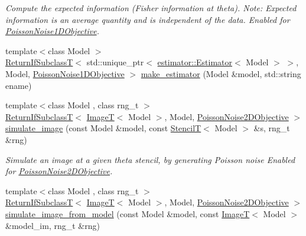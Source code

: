 \begin{DoxyCompactItemize}
\begin{DoxyCompactList}\small\item\em Compute the expected information (Fisher information at theta). Note\+: Expected information is an average quantity and is independent of the data. Enabled for \hyperlink{classmappel_1_1PoissonNoise1DObjective}{Poisson\+Noise1\+D\+Objective}. \end{DoxyCompactList}\item 
{\footnotesize template$<$class Model $>$ }\\\hyperlink{namespacemappel_a3b77d227658ba3ba9e16fea6fa6e626d}{Return\+If\+SubclassT}$<$ std\+::unique\+\_\+ptr$<$ \hyperlink{classmappel_1_1estimator_1_1Estimator}{estimator\+::\+Estimator}$<$ Model $>$ $>$, Model, \hyperlink{classmappel_1_1PoissonNoise1DObjective}{Poisson\+Noise1\+D\+Objective} $>$ \hyperlink{namespacemappel_1_1methods_af2dbe8ce33d78622eca14c57aefa1d7b}{make\+\_\+estimator} (Model \&model, std\+::string ename)
\item 
{\footnotesize template$<$class Model , class rng\+\_\+t $>$ }\\\hyperlink{namespacemappel_a3b77d227658ba3ba9e16fea6fa6e626d}{Return\+If\+SubclassT}$<$ \hyperlink{namespacemappel_a14658186b77757f3c35a69cb1be6cf4b}{ImageT}$<$ Model $>$, Model, \hyperlink{classmappel_1_1PoissonNoise2DObjective}{Poisson\+Noise2\+D\+Objective} $>$ \hyperlink{namespacemappel_1_1methods_a2b9a50b06cafb7ac9d857589df8979dc}{simulate\+\_\+image} (const Model \&model, const \hyperlink{namespacemappel_a3a06598240007876f8c4bf834ad86197}{StencilT}$<$ Model $>$ \&s, rng\+\_\+t \&rng)
\begin{DoxyCompactList}\small\item\em Simulate an image at a given theta stencil, by generating Poisson noise Enabled for \hyperlink{classmappel_1_1PoissonNoise2DObjective}{Poisson\+Noise2\+D\+Objective}. \end{DoxyCompactList}\item 
{\footnotesize template$<$class Model , class rng\+\_\+t $>$ }\\\hyperlink{namespacemappel_a3b77d227658ba3ba9e16fea6fa6e626d}{Return\+If\+SubclassT}$<$ \hyperlink{namespacemappel_a14658186b77757f3c35a69cb1be6cf4b}{ImageT}$<$ Model $>$, Model, \hyperlink{classmappel_1_1PoissonNoise2DObjective}{Poisson\+Noise2\+D\+Objective} $>$ \hyperlink{namespacemappel_1_1methods_a2dd4cb94fa6669d64488ed95bc1c6d02}{simulate\+\_\+image\+\_\+from\+\_\+model} (const Model \&model, const \hyperlink{namespacemappel_a14658186b77757f3c35a69cb1be6cf4b}{ImageT}$<$ Model $>$ \&model\+\_\+im, rng\+\_\+t \&rng)

\end{DoxyCompactItemize}
